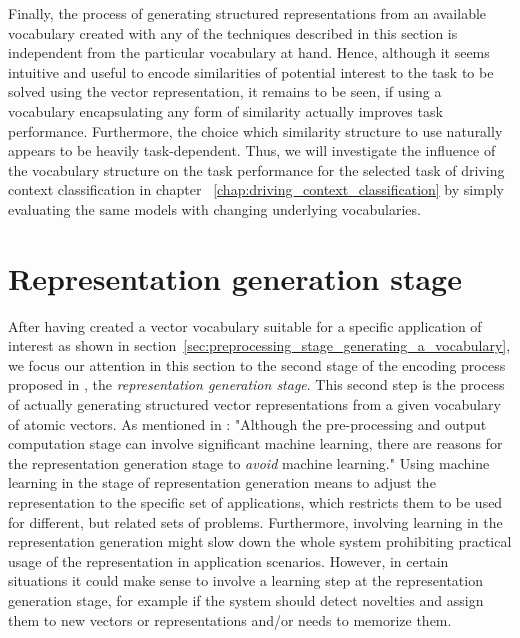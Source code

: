Finally, the process of generating structured representations from an available vocabulary created with any of the techniques described in this section is independent from the particular vocabulary at hand.
Hence, although it seems intuitive and useful to encode similarities of potential interest to the task to be solved using the vector representation, it remains to be seen, if using a vocabulary encapsulating any form of similarity actually improves task performance.
Furthermore, the choice which similarity structure to use naturally appears to be heavily task-dependent.
Thus, we will investigate the influence of the vocabulary structure on the task performance for the selected task of driving context classification in chapter ~\ref{chap:driving_context_classification} by simply evaluating the same models with changing underlying vocabularies.

\section{Representation generation stage}%
\label{sec:representation_generation_stage}

After having created a vector vocabulary suitable for a specific application of interest as shown in section~\ref{sec:preprocessing_stage_generating_a_vocabulary}, we focus our attention in this section to the second stage of the encoding process proposed in \cite{Gallant2013}, the \emph{representation generation stage}.
This second step is the process of actually generating structured vector representations from a given vocabulary of atomic vectors.
As mentioned in \cite{Gallant2013}: "Although the pre-processing and output computation stage can involve significant machine learning, there are reasons for the representation generation stage to \emph{avoid} machine learning."
Using machine learning in the stage of representation generation means to adjust the representation to the specific set of applications, which restricts them to be used for different, but related sets of problems.
Furthermore, involving learning in the representation generation might slow down the whole system prohibiting practical usage of the representation in application scenarios.
However, in certain situations it could make sense to involve a learning step at the representation generation stage, for example if the system should detect novelties and assign them to new vectors or representations and/or needs to memorize them.

